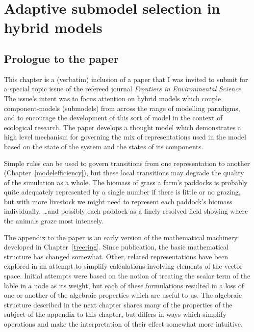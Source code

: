 

\chapter[ADAPTIVE SUBMODEL SELECTION IN HYBRID MODELS]{Adaptive submodel selection in hybrid  models}\label{adaptiveselection}

\WeAreOn{\cthree}
\section{Prologue to the paper}  
This chapter is a (verbatim) inclusion of a paper that I was invited
to submit for a special topic issue of the refereed journal
\emph{Frontiers in Environmental Science}. The issue's intent was to
focus attention on hybrid models which couple component-models
(submodels) from across the range of modelling paradigms, and to
encourage the development of this sort of model in the context of
ecological research.  The paper develops a thought model which
demonstrates a high level mechanism for governing the mix of
representations used in the model based on the state of the system and
the states of its components.

Simple rules can be used to govern transitions from one representation
to another (Chapter~\ref{modelefficiency}), but these local
transitions may degrade the quality of the simulation as a whole. The
biomass of grass a farm's paddocks is probably quite
adequately represented by a single number if there is little or no
grazing, but with more livestock we might need to represent each
paddock's biomass individually, \ldots and possibly each paddock as a
finely resolved field showing where the animals graze most intensely.

The appendix to the paper is an early version of the mathematical
machinery developed in Chapter~\ref{treering}. Since publication, the
basic mathematical structure has changed somewhat.  Other, related
representations have been explored in an attempt to simplify
calculations involving elements of the vector space. Initial attempts
were based on the notion of treating the scalar term of the lable in a
node as its weight, but each of these formulations resulted in a loss
of one or another of the algebraic properties which are useful to
us. The algebraic structure described in the next chapter shares many
of the properties of the subject of the appendix to this chapter, but
differs in ways which simplify operations and make the interpretation
of their effect somewhat more intuitive.

